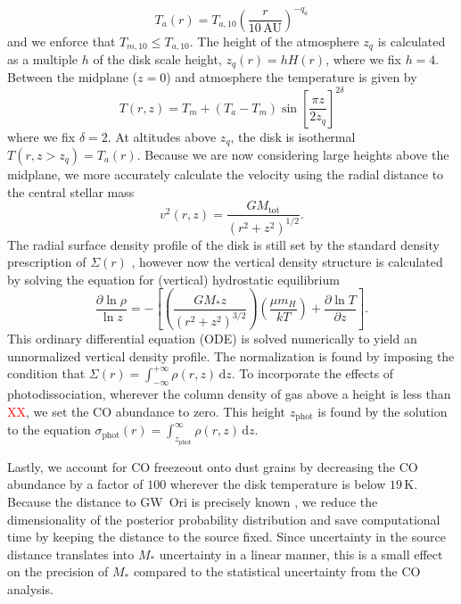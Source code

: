 \documentclass{aastex6}
\newcommand{\todo}[1]{ \textcolor{red}{#1}}
\begin{document}
\begin{equation}
	T_a(r) = T_{a,10} \left ( \frac{r}{10\,\textrm{AU}} \right )^{-q_a}
\end{equation}
and we enforce that $T_{m,10} \leq T_{a,10}$. The height of the atmosphere $z_q$ is calculated as a multiple $h$ of the disk scale height, $z_q(r) = h H(r)$, where we fix $h = 4$. Between the midplane ($z$$=$$0$) and atmosphere the temperature is given by
\begin{equation}
	T(r, z) = T_m + (T_a - T_m)  \sin \left [ \frac{\pi z}{2 z_q} \right ]^{2 \delta}
\end{equation}
where we fix $\delta = 2$. At altitudes above $z_q$, the disk is isothermal $T(r, z > z_q) = T_a(r)$. Because we are now considering large heights above the midplane, we more accurately calculate the velocity using the radial distance to the central stellar mass
\begin{equation}
	v^2(r, z) = \frac{G M_\mathrm{tot}}{(r^2 + z^2)^{1/2}}.
\end{equation}
The radial surface density profile of the disk is still set by the standard density prescription of $\Sigma(r)$ \citep[see][]{czekala15a}, however now the vertical density structure is calculated by solving the equation for (vertical) hydrostatic equilibrium
\begin{equation}
	\frac{\partial \ln \rho}{\ln z} = - \left [\left (\frac{G M_\ast z}{(r^2 + z^2)^{3/2}} \right) \left ( \frac{\mu m_H}{k T} \right ) + \frac{\partial \ln T}{\partial z} \right].
\end{equation}
This ordinary differential equation (ODE) is solved numerically to yield an unnormalized vertical density profile. The normalization is found by imposing the condition that $\Sigma(r) = \int_{-\infty}^{+\infty} \rho(r, z)\, \mathrm{d}z$. To incorporate the effects of photodissociation, wherever the column density of gas above a height is less than \todo{XX}, we set the CO abundance to zero. This height $z_\mathrm{phot}$ is found by the solution to the equation $\sigma_\mathrm{phot}(r) = \int_{z_\mathrm{phot}}^\infty \rho(r, z)\, \mathrm{d}z.$

Lastly, we account for CO freezeout onto dust grains by decreasing the CO abundance by a factor of $100$ wherever the disk temperature is below $19\,$K. Because the distance to GW~Ori is precisely known \citep[$414 \pm 7\,\textrm{pc}$,][]{menten07}, we reduce the dimensionality of the posterior probability distribution and save computational time by keeping the distance to the source fixed. Since uncertainty in the source distance translates into $M_\ast$ uncertainty in a linear manner, this is a small effect on the precision of $M_\ast$ compared to the statistical uncertainty from the CO analysis.
\end{document}
